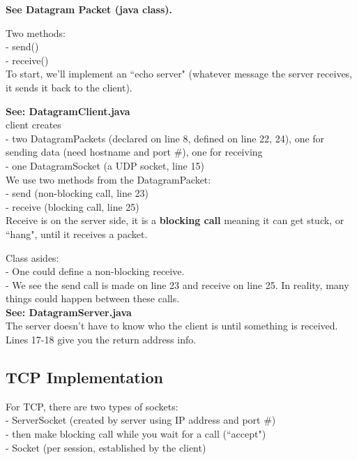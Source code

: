 \documentclass[twoside]{article}
\begin{document}
\textbf{See Datagram Packet (java class).}

Two methods: \\
  - send()    \\
  - receive()  \\
  
To start, we'll implement an ``echo server" (whatever message the server receives, it sends it back to the client).

\textbf{See: DatagramClient.java} \\

client creates \\
 - two DatagramPackets (declared on line 8, defined on line 22, 24), one for sending data (need hostname and port \#), one for receiving \\
 - one DatagramSocket (a UDP socket, line 15) \\
 
We use two methods from the DatagramPacket: \\
 - send (non-blocking call, line 23) \\
 - receive (blocking call, line 25) \\

Receive is on the server side, it is a \textbf{blocking call} meaning it can get stuck, or ``hang", until it receives a packet.

Class asides: \\
 - One could define a non-blocking receive. \\
 - We see the send call is made on line 23 and receive on line 25.  In reality, many things could happen between these calls. \\

\textbf{See: DatagramServer.java} \\

The server doesn't have to know who the client is until something is received.  Lines 17-18 give you the return address info.

\subsection{TCP Implementation}

For TCP, there are two types of sockets: \\ 
- ServerSocket (created by server using IP address and port \#) \\
    - then make blocking call while you wait for a call (``accept") \\
- Socket (per session, established by the client)\\
\end{document}
